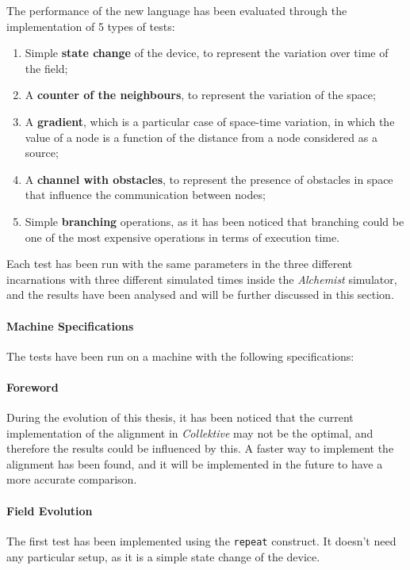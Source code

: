 The performance of the new language has been evaluated through the implementation of 5 types of tests:
\begin{enumerate}
    \item Simple \textbf{state change} of the device, to represent the variation over time of the field;
    \item A \textbf{counter of the neighbours}, to represent the variation of the space;
    \item A \textbf{gradient}, which is a particular case of space-time variation, in which the value of a node is a
        function of the distance from a node considered as a source;
    \item A \textbf{channel with obstacles}, to represent the presence of obstacles in space that influence the communication between nodes;
    \item Simple \textbf{branching} operations, as it has been noticed that branching could be one of the most expensive operations in terms of execution time.
\end{enumerate}

Each test has been run with the same parameters in the three different incarnations with three different simulated times
inside the \emph{Alchemist} simulator, and the results have been analysed and will be further discussed in this section.

\paragraph{Machine Specifications}
The tests have been run on a machine with the following specifications:

\paragraph{Foreword}
During the evolution of this thesis, it has been noticed that the current implementation of the alignment in \emph{Collektive} may not be the optimal,
and therefore the results could be influenced by this.
A faster way to implement the alignment has been found, and it will be implemented in the future to have a more accurate comparison.

\paragraph{Field Evolution}
The first test has been implemented using the \texttt{repeat} construct.
It doesn't need any particular setup, as it is a simple state change of the device.


